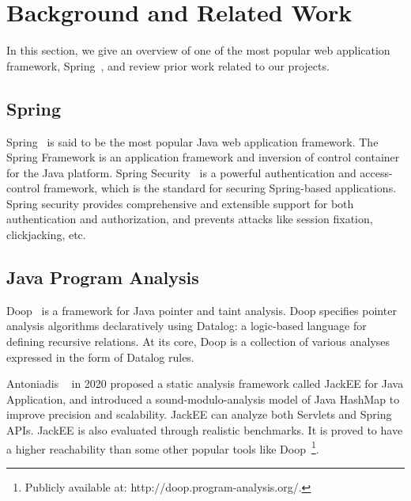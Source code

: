 \section{Background and Related Work} %
In this section, we give an overview of one of the most popular web application
framework, Spring~\cite{spring+security:home}, and review prior work related to
our projects.

\subsection{Spring}

Spring~\cite{spring+security:home} is said to be the most popular Java web
application framework.
%
The Spring Framework is an application framework and inversion of control
container for the Java platform.
%
Spring Security~\cite{spring+security:method} is a powerful authentication and
access-control framework, which is the standard for securing Spring-based
applications.
%
Spring security provides comprehensive and extensible support for both
authentication and authorization, and prevents attacks like session fixation,
clickjacking, etc.

\subsection{Java Program Analysis}

Doop~\cite{Bravenboer:2009:Doop} is a framework for Java pointer and taint
analysis.
%
Doop specifies pointer analysis algorithms declaratively using Datalog: a
logic-based language for defining recursive relations.
%
At its core, Doop is a collection of various analyses expressed in the form of
Datalog rules.

Antoniadis \etal~\cite{Antoniadis+etal:2020:Java} in 2020 proposed a static
analysis framework called JackEE for Java Application, and introduced a
sound-modulo-analysis model of Java HashMap to improve precision and
scalability. JackEE can analyze both Servlets and Spring APIs. JackEE is also
evaluated through realistic benchmarks. It is proved to have a higher
reachability than some other popular tools like Doop~\footnote{Publicly
  available at: http://doop.program-analysis.org/.}.

